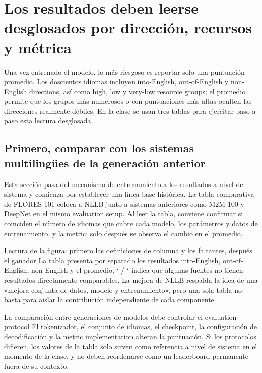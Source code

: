\section{Los resultados deben leerse desglosados por dirección, recursos y métrica}

Una vez entrenado el modelo, lo más riesgoso es reportar solo una puntuación promedio. Los doscientos idiomas incluyen into-English, out-of-English y non-English directions, así como high, low y very-low resource groups; el promedio permite que los grupos más numerosos o con puntuaciones más altas oculten las direcciones realmente débiles. En la clase se usan tres tablas para ejercitar paso a paso esta lectura desglosada.

\subsection{Primero, comparar con los sistemas multilingües de la generación anterior}

Esta sección pasa del mecanismo de entrenamiento a los resultados a nivel de sistema y comienza por establecer una línea base histórica. La tabla comparativa de FLORES-101 coloca a NLLB junto a sistemas anteriores como M2M-100 y DeepNet en el mismo evaluation setup. Al leer la tabla, conviene confirmar si coinciden el número de idiomas que cubre cada modelo, los parámetros y datos de entrenamiento, y la metric; solo después se observa el cambio en el promedio.


\begin{knowledgebox}{Lectura de la figura: primero las definiciones de columna y los faltantes, después el ganador}
La tabla presenta por separado los resultados into-English, out-of-English, non-English y el promedio; `-/-` indica que algunas fuentes no tienen resultados directamente comparables. La mejora de NLLB respalda la idea de una «mejora conjunta de datos, modelo y entrenamiento», pero una sola tabla no basta para aislar la contribución independiente de cada componente.
\end{knowledgebox}

\begin{warningbox}{La comparación entre generaciones de modelos debe controlar el evaluation protocol}
El tokenizador, el conjunto de idiomas, el checkpoint, la configuración de decodificación y la metric implementation alteran la puntuación. Si los protocolos difieren, los valores de la tabla solo sirven como referencia a nivel de sistema en el momento de la clase, y no deben reordenarse como un leaderboard permanente fuera de su contexto.
\end{warningbox}

